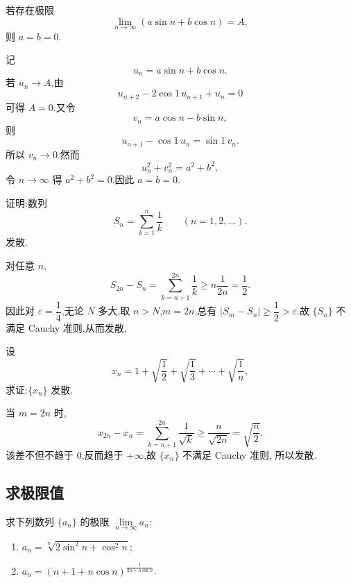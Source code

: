 \begin{example}
  若存在极限
  \[
    \displaystyle\lim\limits_{n\to\infty}(a\sin n+b\cos n)=A,
  \]
  则 $a=b=0$.
\end{example}
\exampleblank

\begin{solution}
  记
  \[
    u_n=a\sin n+b\cos n.
  \]
  若 $u_n\to A$,由
  \[
    u_{n+2}-2\cos1\,u_{n+1}+u_n=0
  \]
  可得 $A=0$.又令
  \[
    v_n=a\cos n-b\sin n,
  \]
  则
  \[
    u_{n+1}-\cos1\,u_n=\sin1\,v_n.
  \]
  所以 $v_n\to0$.然而
  \[
    u_n^2+v_n^2=a^2+b^2,
  \]
  令 $n\to\infty$ 得 $a^2+b^2=0$.因此 $a=b=0$.
\end{solution}




\begin{example}
  证明:数列
  \[
    S_n=\sum\limits_{k=1}^n\dfrac{1}{k}\qquad(n=1,2,\ldots).
  \]
  发散.
\end{example}
\exampleblank

\begin{solution}
  对任意 $n$,
  \[
    S_{2n}-S_n=\sum\limits_{k=n+1}^{2n}\dfrac{1}{k}
    \geq n\dfrac{1}{2n}=\dfrac{1}{2}.
  \]
  因此对 $\varepsilon=\dfrac{1}{4}$,无论 $N$ 多大,取 $n>N$,$m=2n$,总有
  $|S_m-S_n|\geq\dfrac{1}{2}>\varepsilon$.故 $\{S_n\}$ 不满足 Cauchy 准则,从而发散.
\end{solution}

\begin{example}
  设
  \[
    x_n=1+\sqrt{\dfrac{1}{2}}+\sqrt{\dfrac{1}{3}}+\cdots+\sqrt{\dfrac{1}{n}},
  \]
  求证:$\{x_n\}$ 发散.
\end{example}
\exampleblank

\begin{solution}
  当 $m=2n$ 时,
  \[
    x_{2n}-x_n
    =\sum\limits_{k=n+1}^{2n}\dfrac{1}{\sqrt k}
    \geq\dfrac{n}{\sqrt{2n}}=\sqrt{\dfrac{n}{2}}.
  \]
  该差不但不趋于 $0$,反而趋于 $+\infty$,故 $\{x_n\}$ 不满足 Cauchy 准则,
  所以发散.
\end{solution}



\subsection{求极限值}



\begin{example}
  求下列数列 $\{a_n\}$ 的极限 $\displaystyle \lim\limits_{n\to\infty}a_n$:
  \begin{enumerate}
    \item $\displaystyle a_n=\sqrt[n]{2\sin^2n+\cos^2n}$;
    \item $\displaystyle a_n=(n+1+n\cos n)^{\frac{1}{2n+n\sin n}}$.
  \end{enumerate}
\end{example}
\exampleblank

